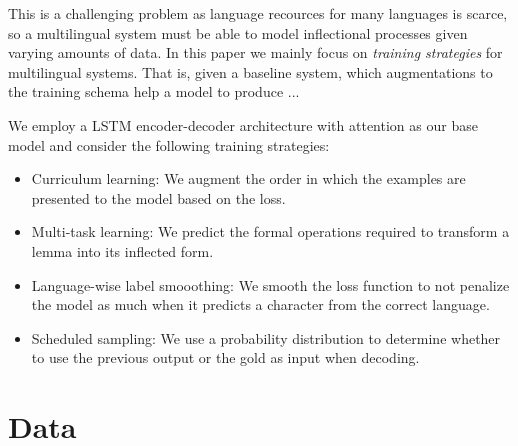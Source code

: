 \documentclass[11pt,a4paper]{article}
\begin{document}
This is a challenging problem as language recources for many languages
is scarce, so a multilingual system must be able to model inflectional
processes given varying amounts of data. In this paper we mainly focus
on \emph{training strategies} for multilingual systems. That is, given
a baseline system, which augmentations to the training schema help a
model to produce ...




We employ a LSTM encoder-decoder architecture with attention as our
base model and consider the following training strategies:

\begin{itemize}
\item Curriculum learning: We augment the order in which the examples are presented to the model based on the loss.
\item Multi-task learning: We predict the formal operations required to transform a lemma into its inflected form.
\item Language-wise label smooothing: We smooth the loss function to not penalize the model as much when it predicts a character from the correct language.
\item Scheduled sampling: We use a probability distribution to determine whether to use the previous output or the gold as input when decoding.
\end{itemize}

%


\section{Data}
\end{document}
